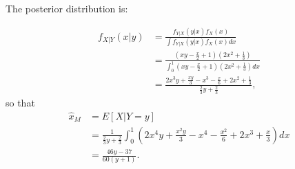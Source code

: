 \begin{problem}{4} The posterior distribution is:

\begin{align*}
f_{X|Y}(x|y) &= \frac{f_{Y|X}(y|x) f_{X}(x)}{\int f_{Y|X}(y|x) f_{X}(x) dx} \\
& = \frac{(xy- \frac{x}{2}+1)(2x^2+\frac{1}{3})}{\int_0^1 (xy- \frac{x}{2}+1)(2x^2+\frac{1}{3}) dx}\\
& = \frac{2x^3y+\frac{xy}{3}-x^3-\frac{x}{6}+2x^2+\frac{1}{3}}{\frac{2}{3}y+\frac{2}{3}},
\end{align*} 
so that
\begin{align*}
\hat x_M &= E[X|Y=y]\\
& = \frac{1}{\frac{2}{3}y+\frac{2}{3}} \int_0^1 \left (2x^4y+\frac{x^2y}{3}-x^4-\frac{x^2}{6}+2x^3+\frac{x}{3} \right)dx \\
& = \frac{46y-37}{60(y+1)}.
\end{align*} 

\end{problem}

